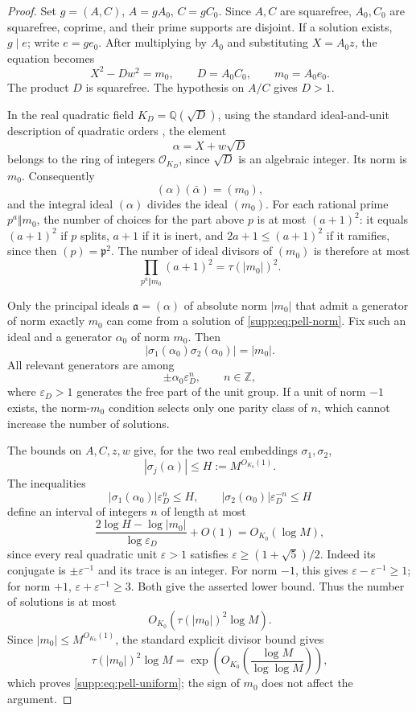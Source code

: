 \begin{proof}
Set $g=(A,C)$, $A=gA_0$, $C=gC_0$. Since $A,C$ are squarefree, $A_0,C_0$ are squarefree, coprime, and their prime supports are disjoint. If a solution exists, $g\mid e$; write $e=ge_0$. After multiplying by $A_0$ and substituting $X=A_0z$, the equation becomes
\begin{equation}\label{supp:eq:pell-norm}
 X^2-Dw^2=m_0,
 \qquad
 D=A_0C_0,
 \qquad
 m_0=A_0e_0.
\end{equation}
The product $D$ is squarefree. The hypothesis on $A/C$ gives $D>1$.

In the real quadratic field $K_D=\mathbb Q(\sqrt D)$, using the standard
ideal-and-unit description of quadratic orders \cite{HalterKoch2013}, the element
\[
 \alpha=X+w\sqrt D
\]
belongs to the ring of integers $\mathcal O_{K_D}$, since $\sqrt D$ is an algebraic integer. Its norm is $m_0$. Consequently
\[
 (\alpha)(\bar\alpha)=(m_0),
\]
and the integral ideal $(\alpha)$ divides the ideal $(m_0)$. For each rational prime $p^a\Vert m_0$, the number of choices for the part above $p$ is at most $(a+1)^2$: it equals $(a+1)^2$ if $p$ splits, $a+1$ if it is inert, and $2a+1\le(a+1)^2$ if it ramifies, since then $(p)=\mathfrak p^2$. The number of ideal divisors of $(m_0)$ is therefore at most
\[
 \prod_{p^a\Vert m_0}(a+1)^2=\tau(|m_0|)^2.
\]

Only the principal ideals $\mathfrak a=(\alpha)$ of absolute norm
$|m_0|$ that admit a generator of norm exactly $m_0$ can come from a
solution of \eqref{supp:eq:pell-norm}. Fix such an ideal and a generator
$\alpha_0$ of norm $m_0$. Then
\[
 |\sigma_1(\alpha_0)\sigma_2(\alpha_0)|=|m_0|.
\]
All relevant generators are among
\[
 \pm\alpha_0\varepsilon_D^n,
 \qquad n\in\mathbb Z,
\]
where $\varepsilon_D>1$ generates the free part of the unit group. If a unit of norm $-1$ exists, the norm-$m_0$ condition selects only one parity class of $n$, which cannot increase the number of solutions.

The bounds on $A,C,z,w$ give, for the two real embeddings $\sigma_1,\sigma_2$,
\[
 |\sigma_j(\alpha)|\le H:=M^{O_{K_0}(1)}.
\]
The inequalities
\[
 |\sigma_1(\alpha_0)|\varepsilon_D^n\le H,
 \qquad
 |\sigma_2(\alpha_0)|\varepsilon_D^{-n}\le H
\]
define an interval of integers $n$ of length at most
\[
 \frac{2\log H-\log|m_0|}{\log\varepsilon_D}+O(1)
 =O_{K_0}(\log M),
\]
since every real quadratic unit $\varepsilon>1$ satisfies
$\varepsilon\ge(1+\sqrt5)/2$. Indeed its conjugate is $\pm\varepsilon^{-1}$
and its trace is an integer. For norm $-1$, this gives
$\varepsilon-\varepsilon^{-1}\ge1$; for norm $+1$,
$\varepsilon+\varepsilon^{-1}\ge3$. Both give the asserted lower bound.
Thus the number of solutions is at most
\[
 O_{K_0}(\tau(|m_0|)^2\log M).
\]
Since $|m_0|\le M^{O_{K_0}(1)}$, the standard explicit divisor bound
\cite{NicolasRobin1983} gives
\[
 \tau(|m_0|)^2\log M
 =
 \exp\!\left(
 O_{K_0}\!\left(\frac{\log M}{\log\log M}\right)
 \right),
\]
which proves \eqref{supp:eq:pell-uniform}; the sign of $m_0$ does not affect the
argument.
\end{proof}
